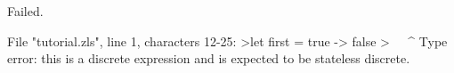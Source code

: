 \chklistingfalse
{}
\begin{ChkListingMsg}
Failed.
\end{ChkListingMsg}
\begin{ChkListingErr}
File "tutorial.zls", line 1, characters 12-25:
>let first = true -> false
>            ^^^^^^^^^^^^^
Type error: this is a discrete expression and is expected to be stateless discrete.
\end{ChkListingErr}
